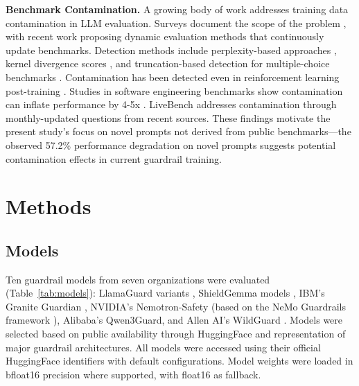 \documentclass{article}
\begin{document}
\textbf{Benchmark Contamination.} A growing body of work addresses training data contamination in LLM evaluation. Surveys document the scope of the problem \cite{xu2024contamination_survey}, with recent work \cite{zhang2025dynamic_benchmark} proposing dynamic evaluation methods that continuously update benchmarks. Detection methods include perplexity-based approaches \cite{yang2024leakage}, kernel divergence scores \cite{li2024kds}, and truncation-based detection for multiple-choice benchmarks \cite{wei2024contamination_measure}. Contamination has been detected even in reinforcement learning post-training \cite{li2025rl_contamination}. Studies in software engineering benchmarks show contamination can inflate performance by 4-5x \cite{li2024lessleakbench}. LiveBench \cite{white2024livebench} addresses contamination through monthly-updated questions from recent sources. These findings motivate the present study's focus on novel prompts not derived from public benchmarks---the observed 57.2\% performance degradation on novel prompts suggests potential contamination effects in current guardrail training.

\section{Methods}

\subsection{Models}
Ten guardrail models from seven organizations were evaluated (Table~\ref{tab:models}): LlamaGuard variants \cite{inan2023llama}, ShieldGemma models \cite{zeng2024shieldgemma}, IBM's Granite Guardian \cite{padmakumar2024granite}, NVIDIA's Nemotron-Safety (based on the NeMo Guardrails framework \cite{rebedea2023nemo}), Alibaba's Qwen3Guard, and Allen AI's WildGuard \cite{han2024wildguard}. Models were selected based on public availability through HuggingFace and representation of major guardrail architectures. All models were accessed using their official HuggingFace identifiers with default configurations. Model weights were loaded in bfloat16 precision where supported, with float16 as fallback.
\end{document}
